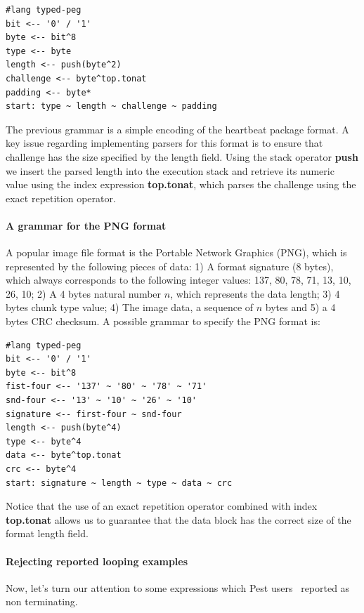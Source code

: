 \documentclass[preprint,12pt]{elsarticle}
\theoremstyle{definition}
\begin{document}
\begin{verbatim}
#lang typed-peg
bit <-- '0' / '1'
byte <-- bit^8
type <-- byte
length <-- push(byte^2)
challenge <-- byte^top.tonat
padding <-- byte*
start: type ~ length ~ challenge ~ padding
\end{verbatim}
The previous grammar is a simple encoding of the heartbeat package format.
A key issue regarding implementing parsers for this format is to ensure that
challenge has the size specified by the length field. Using the stack operator
\textbf{push} we insert the parsed length into the execution stack and retrieve
its numeric value using the index expression \textbf{top.tonat}, which parses
the challenge using the exact repetition operator.

\paragraph{A grammar for the PNG format}

A popular image file format is the Portable Network Graphics (PNG), which
is represented by the following pieces of data: 1)
A format signature (8 bytes), which always corresponds to the
following integer values: 137, 80, 78, 71, 13, 10, 26, 10;
2) A 4 bytes natural number $n$, which represents the data length;
3) 4 bytes chunk type value;
4) The image data, a sequence of $n$ bytes and
5) a 4 bytes CRC checksum.
A possible grammar to specify the PNG format is:
\begin{verbatim}
#lang typed-peg
bit <-- '0' / '1'
byte <-- bit^8
fist-four <-- '137' ~ '80' ~ '78' ~ '71'
snd-four <-- '13' ~ '10' ~ '26' ~ '10'
signature <-- first-four ~ snd-four
length <-- push(byte^4)
type <-- byte^4
data <-- byte^top.tonat
crc <-- byte^4
start: signature ~ length ~ type ~ data ~ crc
\end{verbatim}
Notice that the use of an exact repetition operator combined with
index \textbf{top.tonat} allows us to guarantee that the data block
has the correct size of the format length field.

\paragraph{Rejecting reported looping examples} Now, let's turn our
attention to some expressions which Pest users~\cite{PESTBUG} reported as
non terminating.
\end{document}
